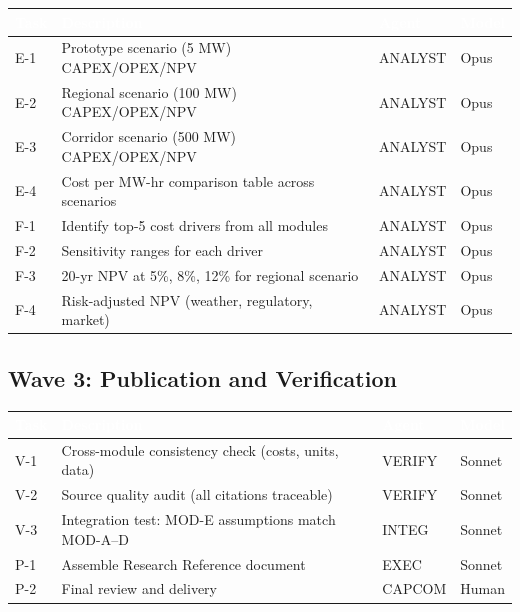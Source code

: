 \documentclass[11pt,letterpaper]{article}
\newcommand{\tableheader}[1]{\textbf{\sffamily\textcolor{white}{#1}}}
\begin{document}
\begin{center}
\begin{tabularx}{\textwidth}{L{2cm}L{5cm}C{1.5cm}X}
\toprule
{}
\tableheader{Task} & \tableheader{Description} & \tableheader{Agent} & \tableheader{Model} \\
\midrule
E-1 & Prototype scenario (5 MW) CAPEX/OPEX/NPV & ANALYST & Opus \\
E-2 & Regional scenario (100 MW) CAPEX/OPEX/NPV & ANALYST & Opus \\
E-3 & Corridor scenario (500 MW) CAPEX/OPEX/NPV & ANALYST & Opus \\
E-4 & Cost per MW-hr comparison table across scenarios & ANALYST & Opus \\
F-1 & Identify top-5 cost drivers from all modules & ANALYST & Opus \\
F-2 & Sensitivity ranges for each driver & ANALYST & Opus \\
F-3 & 20-yr NPV at 5\%, 8\%, 12\% for regional scenario & ANALYST & Opus \\
F-4 & Risk-adjusted NPV (weather, regulatory, market) & ANALYST & Opus \\
\bottomrule
\end{tabularx}
\end{center}

\subsection{Wave 3: Publication and Verification}

\begin{center}
\begin{tabularx}{\textwidth}{L{2cm}L{5cm}C{1.5cm}X}
\toprule
{}
\tableheader{Task} & \tableheader{Description} & \tableheader{Agent} & \tableheader{Model} \\
\midrule
V-1 & Cross-module consistency check (costs, units, data) & VERIFY & Sonnet \\
V-2 & Source quality audit (all citations traceable) & VERIFY & Sonnet \\
V-3 & Integration test: MOD-E assumptions match MOD-A--D & INTEG & Sonnet \\
P-1 & Assemble Research Reference document & EXEC & Sonnet \\
P-2 & Final review and delivery & CAPCOM & Human \\
\bottomrule
\end{tabularx}
\end{center}
\end{document}
